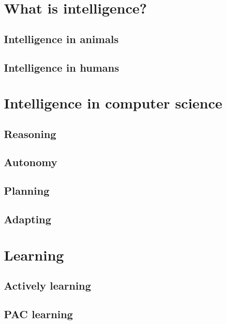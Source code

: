 \documentclass[12pt,a4paper,openright,twoside]{book}
\begin{document}
\section{What is intelligence?}\label{sec:what-is-intelligence}

\subsection{Intelligence in animals}\label{subsec:intelligence-in-animals}

\subsection{Intelligence in humans}\label{subsec:intelligence-in-humans}

\section{Intelligence in computer science}\label{sec:intelligence-in-computer-science}

\subsection{Reasoning}\label{subsec:reasoning}

\subsection{Autonomy}\label{subsec:autonomy}

\subsection{Planning}\label{subsec:planning}

\subsection{Adapting}\label{subsec:adapting}

\section{Learning}\label{sec:learning}

\subsection{Actively learning}\label{subsec:actively-learning}

\subsection{\Acl{PAC} learning}\label{subsec:pac-learning}
\end{document}
